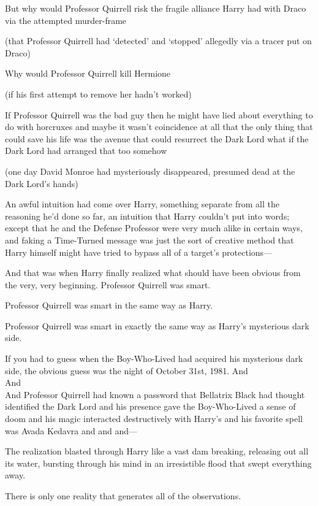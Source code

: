 But why would Professor Quirrell risk the fragile alliance Harry had with Draco 
via the attempted murder-frame

(that Professor Quirrell had `detected' and `stopped' allegedly via a tracer 
put on Draco)

Why would Professor Quirrell kill Hermione

(if his first attempt to remove her hadn't worked)

If Professor Quirrell was the bad guy then he might have lied about everything 
to do with horcruxes and maybe it wasn't coincidence at all that the only thing 
that could save his life was the avenue that could resurrect the Dark Lord what 
if the Dark Lord had arranged that too somehow

(one day David Monroe had mysteriously disappeared, presumed dead at the Dark 
Lord's hands)

An awful intuition had come over Harry, something separate from all the 
reasoning he'd done so far, an intuition that Harry couldn't put into words; 
except that he and the Defense Professor were very much alike in certain ways, 
and faking a Time-Turned message was just the sort of creative method that 
Harry himself might have tried to bypass all of a target's protections---

And that was when Harry finally realized what should have been obvious from the 
very, very beginning.
\sbreak
Professor Quirrell was smart.

Professor Quirrell was smart in the same way as Harry.

Professor Quirrell was smart in exactly the same way as Harry's mysterious dark 
side.

If you had to guess when the Boy-Who-Lived had acquired his mysterious dark 
side, the obvious guess was the night of October 31st, 1981.
\sbreak
And\\
And\\
And Professor Quirrell had known a password that Bellatrix Black had thought 
identified the Dark Lord and his presence gave the Boy-Who-Lived a sense of 
doom and his magic interacted destructively with Harry's and his favorite spell 
was Avada Kedavra and and and---

The realization blasted through Harry like a vast dam breaking, releasing out 
all its water, bursting through his mind in an irresistible flood that swept 
everything away.

There is only one reality that generates all of the observations.

